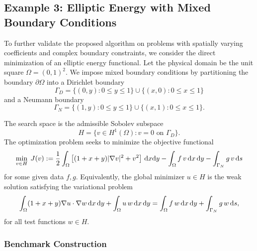 \documentclass[12pt]{amsart}
\newcommand{\D}[1]{\mbox{\rm #1}}
\newcommand{\dd}{\D{d}}
\numberwithin{equation}{section}
\begin{document}
\subsection{Example 3: Elliptic Energy with Mixed Boundary Conditions}

To further validate the proposed algorithm on problems with spatially varying coefficients and complex boundary constraints, we consider the direct minimization of an elliptic energy functional. Let the physical domain be the unit square $\Omega = (0,1)^2$. We impose mixed boundary conditions by partitioning the boundary $\partial\Omega$ into a Dirichlet boundary %
\[
\Gamma_D = \{(0,y) : 0\le y\le 1\} \cup \{(x,0) : 0\le x\le 1\}
\]
and a Neumann boundary %
\[
\Gamma_N = \{(1,y) : 0\le y\le 1\} \cup \{(x,1) : 0\le x\le 1\}.
\]

The search space is the admissible Sobolev subspace 
\[
H = \{ v\in H^1(\Omega) : v=0 \text{ on } \Gamma_D \}.
\]
The optimization problem seeks to minimize the objective functional
\begin{equation*}
    \min_{v\in H}\; J(v) := \frac{1}{2} \int_{\Omega} \left[ (1+x+y)|\nabla v|^2+v^2 \right]\,\dd x\dd y - \int_{\Omega} f\,v\,\dd x\,\dd y - \int_{\Gamma_N} g\,v\,\dd s
\end{equation*}
for some given data $f,g$. Equivalently, the global minimizer $u\in H$ is the weak solution satisfying the variational problem
\begin{equation*}
    \int_{\Omega} (1+x+y)\nabla u\cdot\nabla w\,\dd x\,\dd y + \int_{\Omega}u\,w\,\dd x\,\dd y = \int_{\Omega}f\,w\,\dd x\,\dd y + \int_{\Gamma_N}g\,w\,\dd s,
\end{equation*}
for all test functions $w\in H$.

\subsubsection*{Benchmark Construction}
\end{document}

